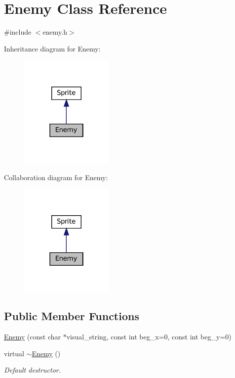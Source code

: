 \hypertarget{classEnemy}{}\section{Enemy Class Reference}
\label{classEnemy}


{\ttfamily \#include $<$enemy.\+h$>$}



Inheritance diagram for Enemy\+:
\nopagebreak
\begin{figure}[H]
\begin{center}
\leavevmode
\includegraphics[width=130pt]{classEnemy__inherit__graph}
\end{center}
\end{figure}


Collaboration diagram for Enemy\+:
\nopagebreak
\begin{figure}[H]
\begin{center}
\leavevmode
\includegraphics[width=130pt]{classEnemy__coll__graph}
\end{center}
\end{figure}
\subsection*{Public Member Functions}
\begin{DoxyCompactItemize}
\item 
\hyperlink{classEnemy_a4ef7e05685524e2f717879b9428e5534}{Enemy} (const char $\ast$visual\+\_\+string, const int beg\+\_\+x=0, const int beg\+\_\+y=0)
\item 
virtual \hyperlink{classEnemy_ac0eec4755e28c02688065f9657150ac3}{$\sim$\+Enemy} ()
\begin{DoxyCompactList}\small\item\em Default destructor. \end{DoxyCompactList}\end{DoxyCompactItemize}
